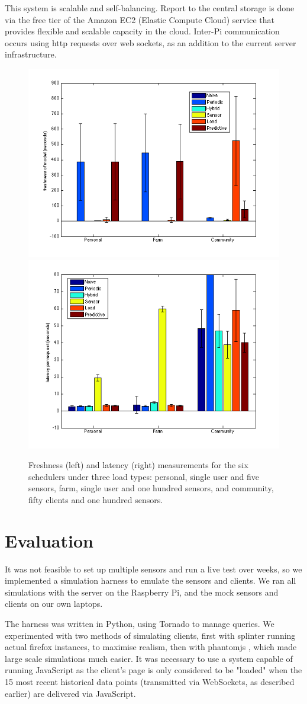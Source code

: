 \documentclass[a4paper]{acm_proc_article-sp}
\begin{document}
This system is scalable and self-balancing.  Report to the central storage is done via the free tier of the Amazon EC2 (Elastic Compute Cloud) service that provides flexible and scalable capacity in the cloud.  Inter-Pi communication occurs using http requests over web sockets, as an addition to the current server infrastructure.

\begin{figure}
  \centering
      \includegraphics[width=0.48\linewidth]{freshness.png}
      \includegraphics[width=0.48\linewidth]{latency_for_schedulers.png}
  \caption{\label{fig:main-results}Freshness (left) and latency (right) measurements for the six schedulers under three load types: personal, single user and five sensors, farm, single user and one hundred sensors, and community, fifty clients and one hundred sensors.}
\end{figure}

\section{Evaluation}

It was not feasible to set up multiple sensors and run a live test over weeks, so we implemented a simulation harness to emulate the sensors and clients.  We ran all simulations with the server on the Raspberry Pi, and the mock sensors and clients on our own laptops. 

The harness was written in Python, using Tornado to manage queries.  We experimented with two methods of simulating clients, first with splinter \cite{Splinter} running actual firefox instances, to maximise realism, then with phantomjs \cite{phantomjs}, which made large scale simulations much easier.  It was necessary to use a system capable of running JavaScript as the client's page is only considered to be "loaded" when the 15 most recent historical data points (transmitted via WebSockets, as described earlier) are delivered via JavaScript.
\end{document}
